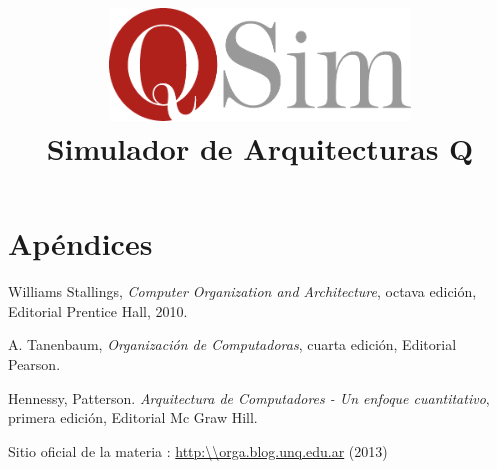 \documentclass[10pt,a4paper]{article}
\author{\susi \and \tati}
\title{\includegraphics[width=8cm]{logo}\\Simulador de Arquitecturas Q}
\begin{document}
\maketitle

\newpage
\tableofcontents

\newpage





\appendix
\part{Apéndices}





\begin{thebibliography}{9}

 Williams Stallings, \emph{Computer Organization and Architecture}, octava edición, Editorial Prentice Hall, 2010.

 A. Tanenbaum, \emph{Organización de Computadoras}, cuarta edición, Editorial Pearson.

 Hennessy, Patterson. \emph{Arquitectura de Computadores - Un enfoque cuantitativo}, primera edición,  Editorial Mc Graw Hill.

 Sitio oficial de la materia \orga: \url{http:\\orga.blog.unq.edu.ar} (2013)

\end{thebibliography}
\end{document}
